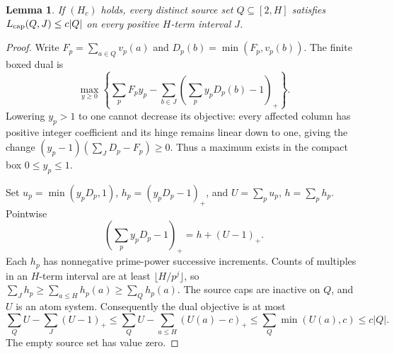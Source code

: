 \documentclass[11pt,a4paper]{article}
\newtheorem{lemma}[theorem]{Lemma}
\newcommand{\LP}{L_{\rm cap}}
\newcommand{\pos}[1]{(#1)_+}
\begin{document}
\begin{lemma}\label{lem:hinge}
If $(H_c)$ holds, every distinct source set $Q\subseteq[2,H]$ satisfies
$\LP(Q,J)\le c|Q|$ on every positive $H$-term interval $J$.
\end{lemma}
\begin{proof}
Write $F_p=\sum_{a\in Q}v_p(a)$ and $D_p(b)=\min(F_p,v_p(b))$.
The finite boxed dual is
\[
 \max_{y\ge0}\left\{\sum_pF_py_p-\sum_{b\in J}
             \pos{\sum_py_pD_p(b)-1}\right\}.
\]
Lowering $y_p>1$ to one cannot decrease its objective: every affected
column has positive integer coefficient and its hinge remains linear
down to one, giving the change
$(y_p-1)(\sum_JD_p-F_p)\ge0$.
Thus a maximum exists in the compact box $0\le y_p\le1$.

Set $u_p=\min(y_pD_p,1)$, $h_p=(y_pD_p-1)_+$, and $U=\sum_pu_p$,
$h=\sum_ph_p$. Pointwise
\[
 \pos{\sum_py_pD_p-1}=h+(U-1)_+.
\]
Each $h_p$ has nonnegative prime-power successive increments. Counts
of multiples in an $H$-term interval are at least $\lfloor H/p^j\rfloor$,
so $\sum_Jh_p\ge\sum_{a\le H}h_p(a)\ge\sum_Qh_p(a)$.
The source caps are inactive on $Q$, and $U$ is an atom system.
Consequently the dual objective is at most
\[
 \sum_QU-\sum_J(U-1)_+
 \le\sum_QU-\sum_{a\le H}(U(a)-c)_+
 \le\sum_Q\min(U(a),c)\le c|Q|.
\]
The empty source set has value zero.
\end{proof}
\end{document}

